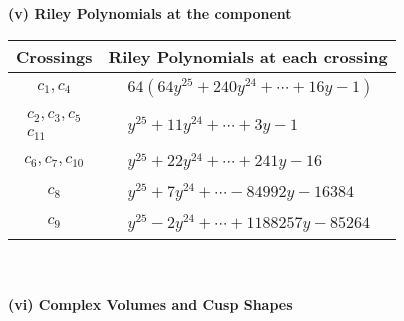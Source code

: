 \documentclass[1p]{elsarticle_modified}
\theoremstyle{definition}
\begin{document}
\newpage\renewcommand{\arraystretch}{1}
\flushleft \textbf{(v) Riley Polynomials at the component}\newline \\
\begin{tabular}{m{50pt}|m{274pt}}
Crossings & \hspace{64pt}Riley Polynomials at each crossing \\
\hline $$\begin{aligned}c_{1},c_{4}\end{aligned}$$&$\begin{aligned}
&64(64 y^{25}+240 y^{24}+\cdots+16 y-1)
\end{aligned}$\\
\hline $$\begin{aligned}c_{2},c_{3},c_{5}\\c_{11}\end{aligned}$$&$\begin{aligned}
&y^{25}+11 y^{24}+\cdots+3 y-1
\end{aligned}$\\
\hline $$\begin{aligned}c_{6},c_{7},c_{10}\end{aligned}$$&$\begin{aligned}
&y^{25}+22 y^{24}+\cdots+241 y-16
\end{aligned}$\\
\hline $$\begin{aligned}c_{8}\end{aligned}$$&$\begin{aligned}
&y^{25}+7 y^{24}+\cdots-84992 y-16384
\end{aligned}$\\
\hline $$\begin{aligned}c_{9}\end{aligned}$$&$\begin{aligned}
&y^{25}-2 y^{24}+\cdots+1188257 y-85264
\end{aligned}$\\
\hline
\end{tabular}\\~\\
\newpage\flushleft \textbf{(vi) Complex Volumes and Cusp Shapes}
\end{document}
